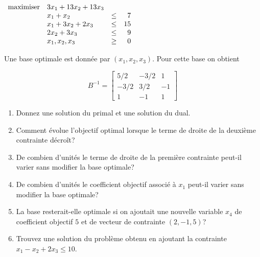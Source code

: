 \begin{enumerate}
    $
    \begin{array}{llcr}
      \mbox{maximiser} & 3x_1+13x_2+13x_3\\
      & x_1+x_2 & \leq & 7\\
      & x_1+ 3x_2+ 2x_3 & \leq & 15\\
      &  2x_2+ 3x_3 & \leq & 9\\
      & x_1, x_2, x_3 & \geq & 0
    \end{array}
    $

    Une base optimale est donnée par $(x_1, x_2, x_3)$. Pour cette base on obtient

    $$
    B^{-1}=
    \left[
      \begin{array}{ccc}
        5/2 & -3/2 & 1\\
        -3/2 & 3/2 & -1\\
        1 & -1 & 1
      \end{array}
    \right]
    $$

    \begin{enumerate}
      \item Donnez une solution du primal et une solution du dual.
      \item Comment évolue l'objectif optimal lorsque le terme de droite de la deuxième contrainte décroît?
      \item De combien d'unités le terme de droite de la première contrainte peut-il varier sans modifier la base optimale?
      \item De combien d'unités le coefficient objectif associé à $x_1$ peut-il varier sans modifier la base
        optimale?
      \item La base resterait-elle optimale si on ajoutait une nouvelle variable $x_4$ de coefficient objectif $5$ et de vecteur de contrainte $(2, -1, 5)$?
      \item Trouvez une solution du problème obtenu en ajoutant la contrainte $x_1-x_2+2x_3 \leq 10$.

    \end{enumerate}



\end{enumerate}
